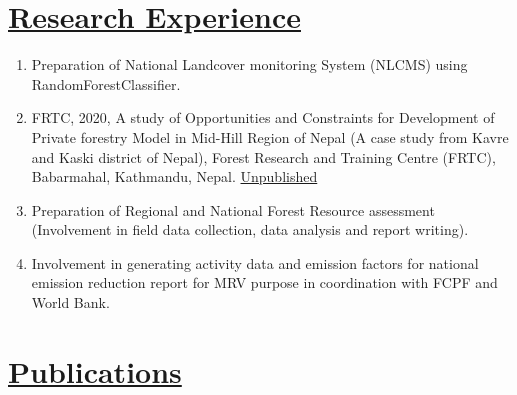 \documentclass[
]{article}
\providecommand{\tightlist}{%
  \setlength{\itemsep}{0pt}\setlength{\parskip}{0pt}}
\begin{document}
\newpage

\section{\texorpdfstring{\underline{Research Experience}}{}}\label{section-7}

\begin{enumerate}
\def\labelenumi{\arabic{enumi}.}
\tightlist
\item
  Preparation of National Landcover monitoring System (NLCMS) using
  RandomForestClassifier.
\item
  FRTC, 2020, A study of Opportunities and Constraints for Development
  of Private forestry Model in Mid-Hill Region of Nepal (A case study
  from Kavre and Kaski district of Nepal), Forest Research and Training
  Centre (FRTC), Babarmahal, Kathmandu, Nepal.
  \href{https://frtc.gov.np/uploads/files/Private\%20forest\%20Model(1).pdf}{Unpublished}
\item
  Preparation of Regional and National Forest Resource assessment
  (Involvement in field data collection, data analysis and report
  writing).
\item
  Involvement in generating activity data and emission factors for
  national emission reduction report for MRV purpose in coordination
  with FCPF and World Bank.
\end{enumerate}

\section{\texorpdfstring{\underline{Publications}}{}}\label{section-8}
\end{document}
